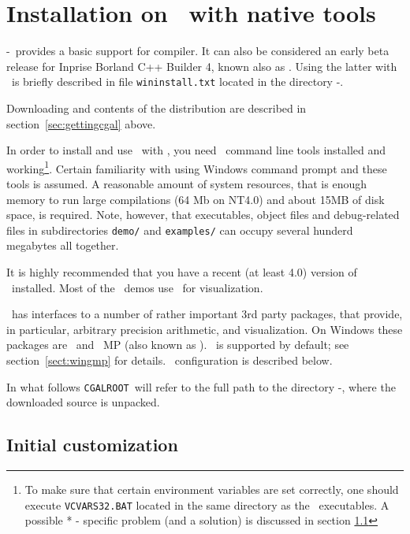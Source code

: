 \section{Installation on \mswin\ with native tools} \label{sec:wininst}
\cgal-\cgalrelease\ provides a basic support for 
compiler.  It can also be considered an early beta release for Inprise
Borland C++ Builder 4, known also as . 
Using the latter with \cgal\ is briefly described
in file \texttt{wininstall.txt} located in the directory
\cgal-\cgalrelease.

Downloading and contents of the distribution are described in 
section~\ref{sec:gettingcgal} above.

In order to install and use \cgal\ with \msvc , you need \msvc\ 
command line tools installed and working\footnote{To make sure that
  certain environment variables are set correctly, one should execute
  \texttt{VCVARS32.BAT} located in the same directory as the \msvc\ 
  executables. A possible * - specific problem (and a
  solution) is discussed in section \ref{subs::inicu}}. 
Certain familiarity with using Windows command prompt
and these tools is assumed. A reasonable amount of system resources,
that is enough memory to run large compilations (64 Mb on NT4.0) and
about 15MB of disk space, is required. Note, however, that 
executables, object files and debug-related files in subdirectories
\texttt{demo/} and \texttt{examples/} can occupy several hunderd
megabytes all together.

It is highly recommended that you have a recent (at least 4.0) version
of \leda\ installed. Most of the \cgal\ demos use \leda\ for
visualization.

\cgal\ has interfaces to a number of rather important 3rd party
packages, that provide, in particular, arbitrary precision arithmetic,
and visualization. On Windows these packages are \leda\ and \gnu\ MP
(also known as \gmp ).  \gmp\ is supported by default; see
section~\ref{sect:wingmp} for details.  \leda\ configuration is
described below.

\newcommand{\CGALR}{\texttt{CGALROOT}}
\newcommand{\bslsh}{$\backslash$}

In what follows \CGALR\ will refer to the full path to the
directory \cgal-\cgalrelease , where the downloaded source is
unpacked.

\subsection{Initial customization}\label{subs::inicu}


